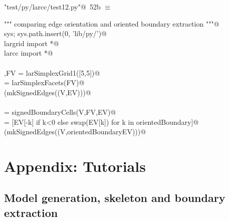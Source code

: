 \documentclass[11pt,oneside]{article}	%
\begin{document}
\begin{flushleft} \small \label{scrap85}
\protect{}\verb@"test/py/larcc/test12.py"@\nobreak\ {\footnotesize 52b }$\equiv$
\vspace{-1ex}
\begin{list}{}{} \item
\mbox{}\verb@""" comparing edge orientation and oriented boundary extraction """@\\
\mbox{}\verb@import sys; sys.path.insert(0, 'lib/py/')@\\
\mbox{}\verb@from largrid import *@\\
\mbox{}\verb@from larcc import *@\\
\mbox{}\verb@@\\
\mbox{}\verb@V,FV = larSimplexGrid1([5,5])@\\
\mbox{}\verb@EV = larSimplexFacets(FV)@\\
\mbox{}\verb@VIEW(mkSignedEdges((V,EV)))@\\
\mbox{}\verb@@\\
\mbox{}\verb@orientedBoundary = signedBoundaryCells(V,FV,EV)@\\
\mbox{}\verb@orientedBoundaryEV = [EV[-k] if k<0 else swap(EV[k]) for k in orientedBoundary]@\\
\mbox{}\verb@VIEW(mkSignedEdges((V,orientedBoundaryEV)))@\\
\mbox{}\verb@@{\NWsep}
\end{list}
\vspace{-2ex}
\end{flushleft}



\appendix

\section{Appendix: Tutorials}


\subsection{Model generation, skeleton and boundary extraction}
\end{document}
